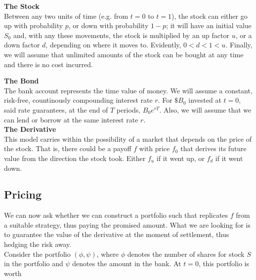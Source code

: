 \documentclass{article}
\begin{document}
\textbf{The Stock}\\
Between any two units of time (e.g. from $t=0$ to $t=1$), the stock can either go up with probability $p$, or down with probability $1-p$; it will have an initial value $S_0$ and, with any these movements, the stock is multiplied by an up factor $u$, or a down factor $d$, depending on where it moves to. Evidently, $0 < d < 1 < u$. Finally, we will assume that unlimited amounts of the stock can be bought at any time and there is no cost incurred.

\begin{center}
\end{center}

\textbf{The Bond}\\
The bank account represents the time value of money. We will assume a constant, risk-free, countinously compounding interest rate $r$. For $\$B_0$ invested at $t=0$, said rate guarantees, at the end of $T$ periods, $B_0 e^{rT}$. Also, we will assume that we can lend or borrow at the same interest rate $r$.\\

\textbf{The Derivative}\\
This model carries within the possibility of a market that depends on the price of the stock. That is, there could be a payoff $f$ with price $f_0$ that derives its future value from the direction the stock took. Either $f_u$ if it went up, or $f_d$ if it went down.

\subsection{Pricing}
We can now ask whether we can construct a portfolio such that replicates $f$ from a suitable strategy, thus paying the promised amount. What we are looking for is to guarantee the value of the derivative at the moment of settlement, thus hedging the risk away.\\

Consider the portfolio $(\phi, \psi)$, where $\phi$ denotes the number of shares for stock $S$ in the portfolio and $\psi$ denotes the amount in the bank. At $t=0$, this portfolio is worth
\end{document}
